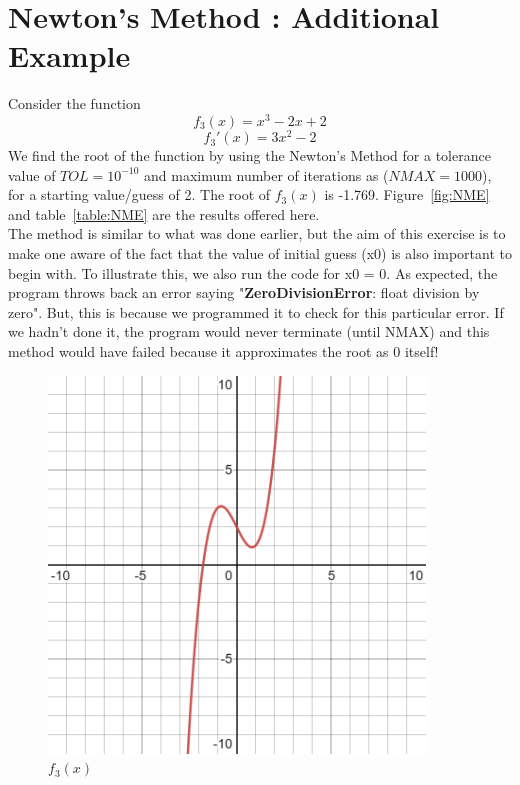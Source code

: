 \documentclass[a4paper, 12pt]{report}
\begin{document}
\chapter{Newton's Method : Additional Example}
Consider the function 
\begin{equation}
    f_{3}(x) = x^{3}- 2x+ 2
\end{equation}
\begin{equation}
    f_{3}'(x) = 3x^{2}- 2
\end{equation}
We find the root of the function by using the Newton's Method for a tolerance value of $TOL=10^{-10}$ and maximum number of iterations as ($NMAX=1000$), for a starting value/guess of 2. The root of $f_{3}(x)$ is -1.769. Figure~\ref{fig:NME} and table~\ref{table:NME} are the results offered here.\\
The method is similar to what was done earlier, but the aim of this exercise is to make one aware of the fact that the value of initial guess (x0) is also important to begin with. To illustrate this, we also run the code for x0 = 0. As expected, the program throws back an error saying "\textbf{ZeroDivisionError}: float division by zero". But, this is because we programmed it to check for this particular error. If we hadn't done it, the program would never terminate (until NMAX) and this method would have failed because it approximates the root as 0 itself!
\begin{figure}[h]
    \centering
    \includegraphics[width=10cm]{f3.png}
    \caption{$f_{3}(x)$}
    \label{fig:f3}
    \end{figure}
\end{document}
